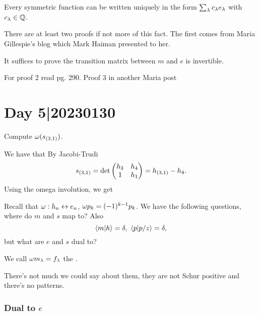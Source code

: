 \documentclass[12pt]{memoir}
\begin{document}
\begin{Th}
    Every symmetric function can be written uniquely in the form $\sum_{\lambda}c_\lambda e_\lambda$ with $c_\lambda\in\mathbb{Q}$. 
\end{Th}

There are at least two proofs if not more of this fact. The first comes from Maria Gillespie's blog which Mark Haiman presented to her. 

\begin{ptcbp}%
    It suffices to prove the transition matrix between $m$ and $e$ is invertible.
\end{ptcbp}

For proof 2 read \cite{StanleyEnum2} pg. 290. Proof 3 in another Maria post %

\section{Day 5|20230130}

\begin{Ej}
Compute $\omega(s_{(3,1)})$.
\end{Ej}

\begin{ptcbr}
We have that 
By Jacobi-Trudi 
$$s_{(3,1)}=\det\begin{pmatrix} h_3 & h_4 \\ 1 & h_1 \end{pmatrix}=h_{(3,1)}-h_4.$$
Using the omega involution, we get 
\end{ptcbr}

Recall that $\omega: h_n\leftrightarrow e_n$, $\omega p_k =(-1)^{k-1}p_k$. We have the following questions, where do $m$ and $s$ map to? Also 
$$\braket{m}{h}=\dl,\ \braket{p}{p/z}=\dl,$$
but what are $e$ and $s$ dual to?

\begin{Def}
    We call $\omega m_\lambda = f_\lambda$ the .
\end{Def}

There's not much we could say about them, they are not Schur positive and there's no patterns. 

\subsubsection{Dual to $e$}
\end{document}
